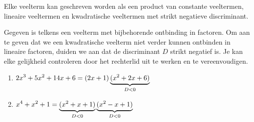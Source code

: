 \documentclass{ximera}
\begin{document}
\begin{stelling}\label{stelling:ontbinden}
Elke veelterm kan geschreven worden als een product van constante veeltermen, lineaire veel\-termen en kwadratische veeltermen met strikt negatieve discriminant.
\end{stelling}

\begin{example}
Gegeven is telkens een veelterm met bijbehorende ontbinding in factoren. Om aan te geven dat we een kwadratische veelterm niet verder kunnen ontbinden in lineaire factoren, duiden we aan dat de discriminant $D$ strikt negatief is. Je kan elke gelijkheid controleren door het rechterlid uit te werken en te vereenvoudigen. 
\begin{enumerate}

\item
$\displaystyle 2x^3 + 5x^2 + 14x + 6 = (2x+1)\underbrace{(x^2+2x+6)}_{D < 0}$
\item
$\displaystyle x^4+x^2+1 = \underbrace{(x^2+x+1)}_{D < 0}\underbrace{(x^2-x+1)}_{D < 0}$
\end{enumerate}
\end{example}

\end{document}
